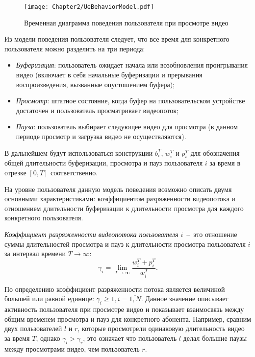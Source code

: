 \begin{figure}[htbp]
\begin{center}
\texttt{[image: Chapter2/UeBehaviorModel.pdf]}
\caption{Временная диаграмма поведения пользователя при просмотре видео}
\label{fig:UeBehaviorModel}
\end{center}
\end{figure}

Из модели поведения пользователя следует, что все время для конкретного пользователя можно разделить на три периода:
\begin{itemize}
	\item \textit{Буферизация}: пользователь ожидает начала или возобновления проигрывания видео (включает в себя начальные буферизации и прерывания воспроизведения, вызванные опустошением буфера);
	\item \textit{Просмотр}: штатное состояние, когда буфер на пользовательском устройстве достаточен и пользователь просматривает видеопоток;
	\item \textit{Пауза}: пользователь выбирает следующее видео для просмотра (в данном периоде просмотр и загрузка видео не осуществляются).
\end{itemize}
В дальнейшем будут использоваться конструкции $b_i^T$, $w_i^T$ и $p_i^T$ для обозначения общей длительности буферизации, просмотра и пауз пользователя $i$ за время в отрезке $[0, T]$ соответственно.

На уровне пользователя данную модель поведения возможно описать двумя основными характеристиками: коэффициентом разряженности видеопотока и отношением длительности буферизации к длительности просмотра для каждого конкретного пользователя.

\begin{definition}
\label{def:VideoSparseness}
    \emph{Коэффициент разряженности видеопотока пользователя $i$}~--~это отношение суммы длительностей просмотра и пауз к длительности просмотра пользователя $i$ за интервал времени $T\rightarrow\infty$:
    $$\gamma_i = \lim\limits_{T\rightarrow\infty} \frac{w_i^T + p_i^T}{w_i^T}.$$
\end{definition}

По определению коэффициент разряженности потока является величиной большей или равной единице: $\gamma_i \geq 1, i=\overline{1,N}$. Данное значение описывает активность пользователя при просмотре видео и показывает взаимосвязь между общим временем просмотра и пауз для конкретного абонента. Например, сравним двух пользователей $l$ и $r$, которые просмотрели одинаковую длительность видео за время $T$, однако $\gamma_l > \gamma_r$, это означает что пользователь $l$ делал большие паузы между просмотрами видео, чем пользователь $r$.

